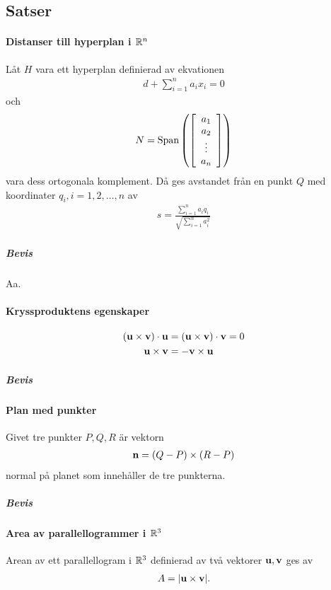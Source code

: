 \subsection{Satser}

\paragraph{Distanser till hyperplan i $\mathbb{R}^n$}
Låt $H$ vara ett hyperplan definierad av ekvationen
\begin{align*}
	d + \sum\limits_{i = 1}^{n} a_ix_i = 0
\end{align*}
och
\begin{align*}
	N = \text{Span}\left(
	\left[\begin{array}{c}
		a_1 \\
		a_2 \\
		\vdots \\
		a_n
	\end{array}\right]\right)
\end{align*}
vara dess ortogonala komplement. Då ges avstandet från en punkt $Q$ med koordinater $q_i, i = 1, 2, \dots, n$ av
\begin{align*}
	s = \frac{\sum\limits_{i = 1}^{n}a_iq_i}{\sqrt{\sum\limits_{i = 1}^{n}a_i^2}}
\end{align*}

\subparagraph{Bevis}
Aa.

\paragraph{Kryssproduktens egenskaper}
\begin{align*}
	(\vect{u}\times\vect{v})\cdot\vect{u} &= (\vect{u}\times\vect{v})\cdot\vect{v} = 0 \\
	\vect{u}\times\vect{v}                &= -\vect{v}\times\vect{u}
\end{align*}

\subparagraph{Bevis}

\paragraph{Plan med punkter}
Givet tre punkter $P, Q, R$ är vektorn
\begin{align*}
	\vect{n} = (Q - P)\times (R - P)
\end{align*}
normal på planet som innehåller de tre punkterna.

\subparagraph{Bevis}

\paragraph{Area av parallellogrammer i $\mathbb{R}^3$}
Arean av ett parallellogram i $\mathbb{R}^3$ definierad av två vektorer $\vect{u}, \vect{v}$ ges av
\begin{align*}
	A = \abs{\vect{u}\times\vect{v}}.
\end{align*}


